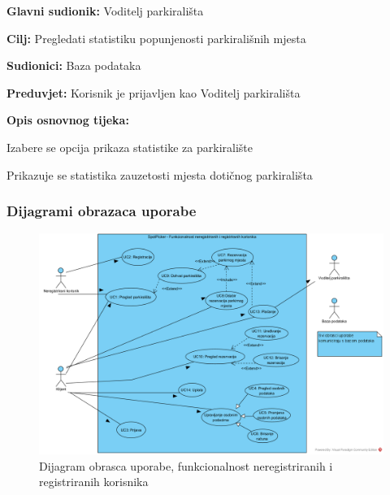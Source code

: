                         \noindent {}
					\begin{packed_item}
	
						\item \textbf{Glavni sudionik: }Voditelj parkirališta
						\item  \textbf{Cilj:} Pregledati statistiku popunjenosti parkirališnih mjesta
						\item  \textbf{Sudionici:} Baza podataka
						\item  \textbf{Preduvjet:} Korisnik je prijavljen kao Voditelj parkirališta
						\item  \textbf{Opis osnovnog tijeka:}
						
						\item[] \begin{packed_enum}
	
							\item Izabere se opcija prikaza statistike za parkiralište
							\item Prikazuje se statistika zauzetosti mjesta dotičnog parkirališta
							
							
						\end{packed_enum}

					\end{packed_item}

				
					
				\subsubsection{Dijagrami obrazaca uporabe}
					
					\begin{figure}[H]
						\centering
						\includegraphics[width=\textwidth]{slike/UCD1.PNG} 
						\caption{Dijagram obrasca uporabe, funkcionalnost neregistriranih i registriranih korisnika}
						\label{fig:promjene6} 
					\end{figure}
					
